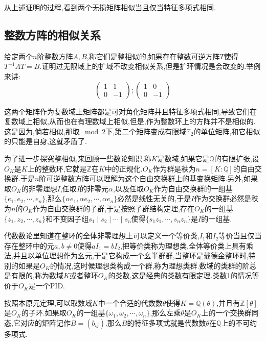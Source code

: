 从上述证明的过程,看到两个无损矩阵相似当且仅当特征多项式相同.
\newpage
\subsection{整数方阵的相似关系}

给定两个$n$阶整数方阵$A,B$,称它们是整相似的,如果存在整数可逆方阵$T$使得$T^{-1}AT=B$.证明过无限域上的扩域不改变相似关系,但是扩环情况是会改变的.举例来讲:
$$\left(\begin{array}{cc}
1&1\\
0&-1\end{array}\right);\left(\begin{array}{cc}
1&0\\
0&-1\end{array}\right)$$

这两个矩阵作为复数域上矩阵都是可对角化矩阵并且特征多项式相同,导致它们在复数域上相似,从而也在有理数域上相似,但是,作为整数环上的方阵并不是相似的.这是因为,倘若相似,那取$\mod2$下,第二个矩阵变成有限域$\mathbb{F}_2$的单位矩阵,和它相似的只能是自身,这就矛盾了.

为了进一步探究整相似,来回顾一些数论知识.称$K$是数域,如果它是$\mathbb{Q}$的有限扩张,设$O_K$是$K$上的整数环,它就是$\mathbb{Z}$在$K$中的正规化.$O_K$作为群是秩为$n=[K:\mathbb{Q}]$的自由交换群.于是$n$阶可逆整数方阵可以理解为这个自由交换群上的基变换矩阵.另外,如果取$O_K$的非零理想$I$,任取$I$的非零元$\alpha$,以及任取$O_K$作为自由交换群的一组基$\{e_1,e_2,\cdots,e_n\}$,那么$\{\alpha e_1,\alpha e_2,\cdots,\alpha e_n\}$必然是线性无关的,于是$I$作为交换群必然是秩为$n$的$O_K$作为自由交换群的子群,于是按照子群结构定理,存在$O_K$的一组基$\{z_1,z_2,\cdots,z_n\}$和不变因子组$s_1\mid s_2\mid\cdots\mid s_n$使得$\{s_1z_1,\cdots,s_nz_n\}$是$I$的一组基.

代数数论里知道在整环的全体非零理想上可以定义一个等价类,$I_1$和$I_2$等价当且仅当存在整环中的元$a,b\not=0$使得$aI_1=bI_2$,把等价类称为理想类,全体等价类上具有乘法,并且以单位理想作为幺元,于是它构成一个幺半群群,当整环是戴德金整环时,特别的如果是$O_K$的情况,这时候理想类构成一个群,称为理想类群.数域的类群的阶总是有限的,称为数域$K$或者整环$O_K$的类数,这是经典的类数有限定理.类数1的情况等价于$O_K$是一个PID.

按照本原元定理,可以取数域$K$中一个合适的代数数$\theta$使得$K=\mathbb{Q}(\theta)$,并且有$\mathbb{Z}[\theta]$是$O_K$的子环.如果取$O_K$的一组基$\{\omega_1,\omega_2,\cdots,\omega_n\}$,那么左乘$\theta$是$O_K$上的一个交换群同态,它对应的矩阵记作$B=(b_{ij})$.那么$B$的特征多项式就是代数数$\theta$在$\mathbb{Q}$上的不可约多项式.

